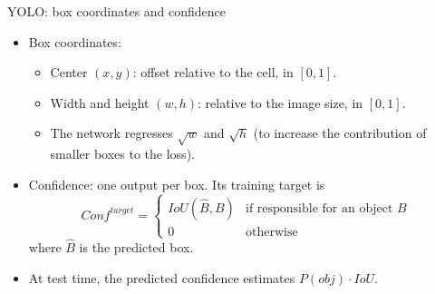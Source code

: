 \documentclass[xcolor=pdftex,dvipsnames,table]{beamer}
\begin{document}
\begin{frame}{YOLO: box coordinates and confidence}
\begin{itemize}
   \item Box coordinates:
   \begin{itemize}
      \item Center $(x, y)$: offset relative to the cell, in $[0,1]$.
      \item Width and height $(w, h)$: relative to the image size, in $[0,1]$.
      \item The network regresses $\sqrt{w}$ and $\sqrt{h}$ (to increase the contribution of smaller boxes to the loss). 
   \end{itemize}
   \item Confidence: one output per box. Its training target is
   \begin{equation*}
   Conf^{target} =
   \begin{cases}
   IoU(\hat{B}, B) & \text{if responsible for an object } B\\
   0 & \text{otherwise}
   \end{cases}
   \end{equation*}
   where $\hat{B}$ is the predicted box.
   \item At test time, the predicted confidence estimates $P(obj) \cdot IoU$. 
\end{itemize}
\end{frame}
\end{document}
